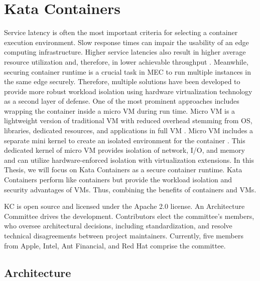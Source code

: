 \chapter{Kata Containers}
\label{chapter:katacontainers}

Service latency is often the most important criteria for selecting a container execution environment. Slow response times can impair the usability of an edge computing infrastructure. Higher service latencies also result in higher average resource utilization and, therefore, in lower achievable throughput \cite{EverartsdeVelp2020}. Meanwhile, securing container runtime is a crucial task in MEC to run multiple instances in the same edge securely. Therefore, multiple solutions have been developed to provide more robust workload isolation using hardware virtualization technology as a second layer of defense. One of the most prominent approaches includes wrapping the container inside a micro VM during run time. Micro VM is a lightweight version of traditional VM with reduced overhead stemming from OS, libraries, dedicated resources, and applications in full VM \cite{Flauzac2020}. Micro VM includes a separate mini kernel to create an isolated environment for the container \cite{Kumar2020}. This dedicated kernel of micro VM provides isolation of network, I/O, and memory and can utilize hardware-enforced isolation with virtualization extensions. In this Thesis, we will focus on Kata Containers as a secure container runtime. Kata Containers perform like containers but provide the workload isolation and security advantages of VMs. Thus, combining the benefits of containers and VMs. \cite{KataContainers}

KC is open source and licensed under the Apache 2.0 license. An Architecture Committee drives the development. Contributors elect the committee's members, who oversee architectural decisions, including standardization, and resolve technical disagreements between project maintainers. Currently, five members from Apple, Intel, Ant Financial, and Red Hat comprise the committee. \cite{KataContainers}\cite{KataContainersGovernance}

\section{Architecture}

